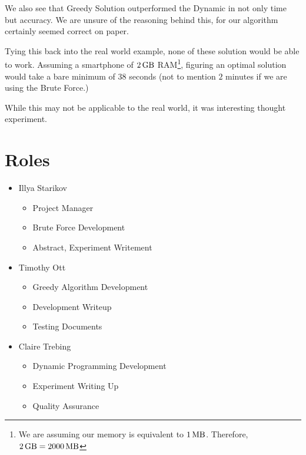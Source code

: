 \documentclass{article}
\begin{document}
We also see that Greedy Solution outperformed the Dynamic in not only time but accuracy. We are unsure of the reasoning behind this, for our algorithm certainly seemed correct on paper.

Tying this back into the real world example, none of these solution would be able to work. Assuming a smartphone of $\SI{2}{\giga\byte}$ RAM\footnote{We are assuming our memory is equivalent to $\SI{1}{\mega\byte}$. Therefore, $\SI{2}{\giga\byte} = \SI{2000}{\mega\byte}$}, figuring an optimal solution would take a bare minimum of $38$ seconds (not to mention $2$ minutes if we are using the Brute Force.)

While this may not be applicable to the real world, it was interesting thought experiment.

\section{Roles}
\begin{itemize}
    \item Illya Starikov
    \begin{itemize}
        \item Project Manager
        \item Brute Force Development
        \item Abstract, Experiment Writement
    \end{itemize}
    \item Timothy Ott
    \begin{itemize}
        \item Greedy Algorithm Development
        \item Development Writeup
        \item Testing Documents
    \end{itemize}

    \item Claire Trebing
    \begin{itemize}
        \item Dynamic Programming Development
        \item Experiment Writing Up
        \item Quality Assurance
    \end{itemize}
\end{itemize}
\end{document}
